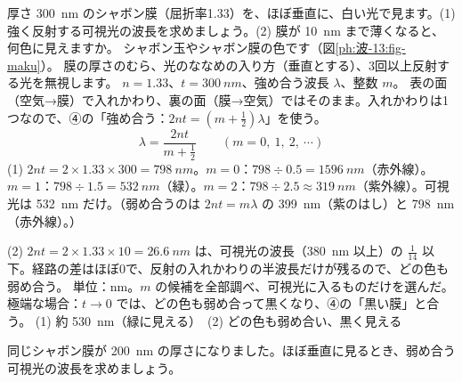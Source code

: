\begin{phreidai}[シャボン膜の色]
\label{ph:波-13:ex5}厚さ \qty{300}{nm} のシャボン膜（屈折率1.33）を、ほぼ垂直に、白い光で見ます。(1) 強く反射する可視光の波長を求めましょう。(2) 膜が \qty{10}{nm} まで薄くなると、何色に見えますか。
\phbamen
シャボン玉やシャボン膜の色です（図\ref{ph:波-13:fig-maku}）。
\phmushi
膜の厚さのむら、光のななめの入り方（垂直とする）、3回以上反射する光を無視します。
\phzu
$n=1.33$、$t=\qty{300}{nm}$、強め合う波長 $\lambda$、整数 $m$。
\phriyu
表の面（空気→膜）で入れかわり、裏の面（膜→空気）ではそのまま。入れかわりは1つなので、④の「強め合う：$2nt=(m+\tfrac12)\lambda$」を使う。
\phtateru
\[ \lambda=\frac{2nt}{m+\frac12}\qquad(m=0,\ 1,\ 2,\ \cdots) \]
\phtoku
(1) $2nt=2\times1.33\times300=\qty{798}{nm}$。$m=0$：$798\div0.5=\qty{1596}{nm}$（赤外線）。$m=1$：$798\div1.5=\qty{532}{nm}$（緑）。$m=2$：$798\div2.5\approx\qty{319}{nm}$（紫外線）。可視光は \qty{532}{nm} だけ。（弱め合うのは $2nt=m\lambda$ の \qty{399}{nm}（紫のはし）と \qty{798}{nm}（赤外線）。）\par
(2) $2nt=2\times1.33\times10=\qty{26.6}{nm}$ は、可視光の波長（\qty{380}{nm} 以上）の $\tfrac{1}{14}$ 以下。経路の差はほぼ0で、反射の入れかわりの半波長だけが残るので、どの色も弱め合う。
\phtashikame
単位：nm。$m$ の候補を全部調べ、可視光に入るものだけを選んだ。極端な場合：$t\to0$ では、どの色も弱め合って黒くなり、④の「黒い膜」と合う。
\kotae (1) 約 \qty{530}{nm}（緑に見える）　(2) どの色も弱め合い、黒く見える
\end{phreidai}
\begin{jibun}
同じシャボン膜が \qty{200}{nm} の厚さになりました。ほぼ垂直に見るとき、弱め合う可視光の波長を求めましょう。
\end{jibun}

